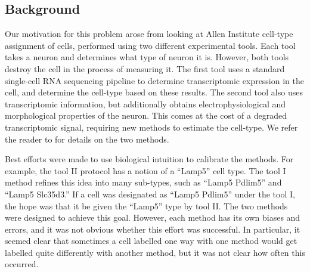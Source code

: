 
\subsection{Background}

Our motivation for this problem arose from looking at Allen Institute cell-type assignment of cells, performed using two different experimental tools.  Each tool takes a neuron and determines what type of neuron it is.  However, both tools destroy the cell in the process of measuring it.  The first tool uses a standard single-cell RNA sequencing pipeline to determine transcriptomic expression in the cell, and determine the cell-type based on these results.  The second tool also uses transcriptomic information, but additionally obtains electrophysiological and morphological properties of the neuron.  This comes at the cost of a degraded transcriptomic signal, requiring new methods to estimate the cell-type.  We refer the reader to \citep{tasic2017shared} for details on the two methods.

Best efforts were made to use biological intuition to calibrate the methods.  For example, the tool II protocol has a notion of a ``Lamp5'' cell type.  The tool I method refines this idea into many sub-types, such as ``Lamp5 Pdlim5'' and ``Lamp5 Slc35d3.''  If a cell was designated as ``Lamp5 Pdlim5'' under the tool I, the hope was that it be given the ``Lamp5'' type by tool II.  The two methods were designed to achieve this goal.  However, each method has its own biases and errors, and it was not obvious whether this effort was successful.  In particular, it seemed clear that sometimes a cell labelled one way with one method would get labelled quite differently with another method, but it was not clear how often this occurred.  

